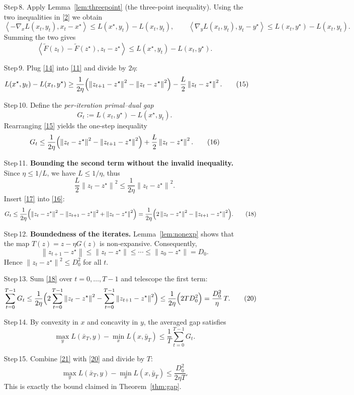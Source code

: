 \documentclass{article}
\newcommand{\norm}[1]{\left\lVert#1\right\rVert}
\newcommand{\inner}[2]{\left\langle #1,#2\right\rangle}
\begin{document}
\begin{enumerate}
\item[Step 8.] Apply Lemma~\ref{lem:threepoint} (the three‑point inequality).  
Using the two inequalities in \eqref{2} we obtain
\[
\inner{-\nabla_x L(x_t,y_t)}{x_t-x^{\star}}
\le L(x^{\star},y_t)-L(x_t,y_t),\qquad
\inner{\nabla_y L(x_t,y_t)}{y_t-y^{\star}}
\le L(x_t,y^{\star})-L(x_t,y_t).
\tag{13}
\]
Summing the two gives
\[
\inner{\tilde{F}(z_t)-\tilde{F}(z^{\star})}{z_t-z^{\star}}
\le L(x^{\star},y_t)-L(x_t,y^{\star}) .
\tag{14}
\]

\item[Step 9.] Plug \eqref{14} into \eqref{11} and divide by $2\eta$:
\[
L(x^{\star},y_t)-L(x_t,y^{\star})
\ge \frac{1}{2\eta}\Bigl(\norm{z_{t+1}-z^{\star}}^{2}
-\norm{z_t-z^{\star}}^{2}\Bigr)
-\frac{L}{2}\norm{z_t-z^{\star}}^{2}.
\tag{15}
\]

\item[Step 10.] Define the \emph{per‑iteration primal–dual gap}
\[
G_t:=L(x_t,y^{\star})-L(x^{\star},y_t) .
\]
Rearranging \eqref{15} yields the one‑step inequality
\[
G_t\le \frac{1}{2\eta}\Bigl(\norm{z_t-z^{\star}}^{2}
-\norm{z_{t+1}-z^{\star}}^{2}\Bigr)+\frac{L}{2}\norm{z_t-z^{\star}}^{2}.
\tag{16}
\]

\item[Step 11.] \textbf{Bounding the second term without the invalid inequality.}  
Since $\eta\le 1/L$, we have $L\le 1/\eta$, thus
\[
\frac{L}{2}\norm{z_t-z^{\star}}^{2}\le \frac{1}{2\eta}\norm{z_t-z^{\star}}^{2}.
\tag{17}
\]
Insert \eqref{17} into \eqref{16}:
\[
G_t\le \frac{1}{2\eta}\Bigl(\norm{z_t-z^{\star}}^{2}
-\norm{z_{t+1}-z^{\star}}^{2}
+\norm{z_t-z^{\star}}^{2}\Bigr)
= \frac{1}{2\eta}\Bigl(2\norm{z_t-z^{\star}}^{2}
-\norm{z_{t+1}-z^{\star}}^{2}\Bigr).
\tag{18}
\]

\item[Step 12.] \textbf{Boundedness of the iterates.}  
Lemma~\ref{lem:nonexp} shows that the map $T(z)=z-\eta G(z)$ is non‑expansive. Consequently,
\[
\norm{z_{t+1}-z^{\star}}\le \norm{z_t-z^{\star}}\le\cdots\le \norm{z_0-z^{\star}}=D_0 .
\tag{19}
\]
Hence $\norm{z_t-z^{\star}}^{2}\le D_0^{2}$ for all $t$.

\item[Step 13.] Sum \eqref{18} over $t=0,\dots,T-1$ and telescope the first term:
\[
\sum_{t=0}^{T-1}G_t
\le \frac{1}{2\eta}\Bigl(2\sum_{t=0}^{T-1}\norm{z_t-z^{\star}}^{2}
-\sum_{t=0}^{T-1}\norm{z_{t+1}-z^{\star}}^{2}\Bigr)
\le \frac{1}{2\eta}\Bigl(2T D_0^{2}\Bigr)
= \frac{D_0^{2}}{\eta}\,T .
\tag{20}
\]

\item[Step 14.] By convexity in $x$ and concavity in $y$, the averaged gap satisfies
\[
\max_{y}L(\bar{x}_T,y)-\min_{x}L(x,\bar{y}_T)
\le \frac{1}{T}\sum_{t=0}^{T-1}G_t .
\tag{21}
\]

\item[Step 15.] Combine \eqref{21} with \eqref{20} and divide by $T$:
\[
\max_{y}L(\bar{x}_T,y)-\min_{x}L(x,\bar{y}_T)
\le \frac{D_0^{2}}{2\eta T}.
\tag{22}
\]
This is exactly the bound claimed in Theorem~\ref{thm:gap}.
\end{enumerate}
\end{document}
